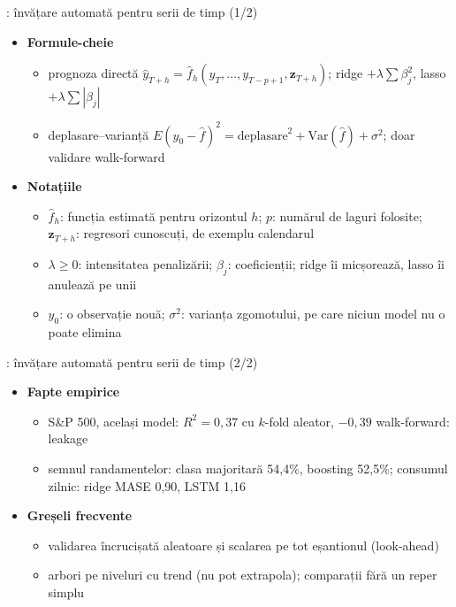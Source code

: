 \begin{frame}{: învățare automată pentru serii de timp (1/2)}
\itemsize{\footnotesize}
\begin{itemize}
    \item \textbf{Formule-cheie}
    \begin{itemize}
        \item prognoza directă $\hat y_{T+h} = \hat f_h(y_T, \dots, y_{T-p+1}, \mathbf z_{T+h})$; ridge $+\lambda\sum\beta_j^2$, lasso $+\lambda\sum|\beta_j|$
        \item deplasare--varianță $E(y_0 - \hat f)^2 = \text{deplasare}^2 + \mathrm{Var}(\hat f) + \sigma^2$; doar validare walk-forward
    \end{itemize}
    \item \textbf{Notațiile}
    \begin{itemize}
        \item $\hat f_h$: funcția estimată pentru orizontul $h$; $p$: numărul de laguri folosite; $\mathbf z_{T+h}$: regresori cunoscuți, de exemplu calendarul
        \item $\lambda \ge 0$: intensitatea penalizării; $\beta_j$: coeficienții; ridge îi micșorează, lasso îi anulează pe unii
        \item $y_0$: o observație nouă; $\sigma^2$: varianța zgomotului, pe care niciun model nu o poate elimina
    \end{itemize}
\end{itemize}
\end{frame}

\begin{frame}{: învățare automată pentru serii de timp (2/2)}
\itemsize{\footnotesize}
\begin{itemize}
    \item \textbf{Fapte empirice}
    \begin{itemize}
        \item S\&P 500, același model: $R^2 = 0{,}37$ cu $k$-fold aleator, $\ensuremath{-}0{,}39$ walk-forward: leakage
        \item semnul randamentelor: clasa majoritară 54{,}4\%, boosting 52{,}5\%; consumul zilnic: ridge MASE 0{,}90, LSTM 1{,}16 
    \end{itemize}
    \item \textbf{Greșeli frecvente}
    \begin{itemize}
        \item validarea încrucișată aleatoare și scalarea pe tot eșantionul (look-ahead)
        \item arbori pe niveluri cu trend (nu pot extrapola); comparații fără un reper simplu
    \end{itemize}
\end{itemize}
\end{frame}

